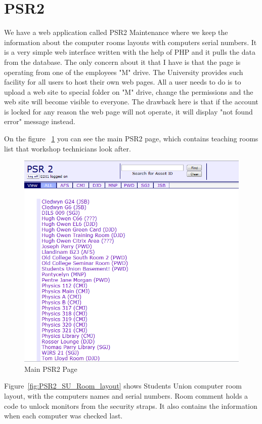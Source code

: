 \documentclass[10pt,a4paper,headinclude=true]{report}
\begin{document}
\section{PSR2}
We have a web application called PSR2 Maintenance where we keep the information about the computer rooms layouts with computers serial numbers. It is a very simple web interface written with the help of PHP and it pulls the data from the database. The only concern about it that I have is that the page is operating from one of the employees "M" drive. The University provides such facility for all users to host their own web pages. All a user needs to do is to upload a web site to special folder on "M" drive, change the permissions and the web site will become visible to everyone. The drawback here is that if the account is locked for any reason the web page will not operate, it will display "not found error" message instead. 

On the figure ~\ref{fig:main_PSR2_page} you can see the main PSR2 page, which contains teaching rooms list that workshop technicians look after.

\begin{figure}[H]
\centering
\centerline{\includegraphics[scale=0.3]{./PSR2}}
\caption{Main PSR2 Page}
\label{fig:main_PSR2_page}
\end{figure}

Figure~\ref{fig:PSR2_SU_Room_layout} shows Students Union computer room layout, with the computers names and serial numbers. Room comment holds a code to unlock monitors from the security straps. It also contains the information when each computer was checked last.
\end{document}
